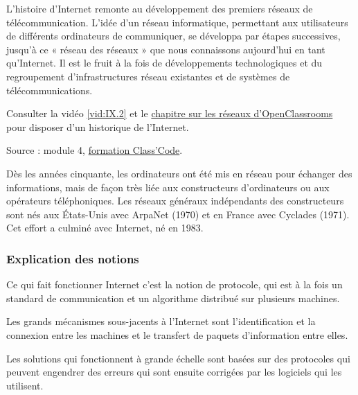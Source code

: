 L’histoire d'Internet remonte au développement des premiers réseaux de télécommunication. L’idée d’un réseau informatique, permettant aux utilisateurs de différents ordinateurs de communiquer, se développa par étapes successives, jusqu'à ce « réseau des réseaux » que nous connaissons aujourd’hui en tant qu'Internet. Il est le fruit à la fois de développements technologiques et du regroupement d’infrastructures réseau existantes et de systèmes de télécommunications.

Consulter la vidéo \cref{vid:IX.2} et le \href{https://openclassrooms.com/fr/courses/4297411-connecter-le-reseau/4304641-comprenez-l-evolution-des-reseaux#r-4358261}{chapitre sur les réseaux d'OpenClassrooms} pour disposer d'un historique de l'Internet. 


\noindent Source : module 4, \href{https://pixees.fr/classcode/formations/module4/}{formation Class'Code}.


\begin{tcolorbox}[title={Repères historiques}, toprule=0pt, leftrule=0pt, rightrule=0pt, arc=0pt,
                  fonttitle=\scshape\boxtitlefont,
                  colbacktitle=white, coltitle=firstcolor, colframe=firstcolor, colback=firstcolor!10,
                  breakable, enhanced jigsaw]
Dès les années cinquante, les ordinateurs ont été mis en réseau pour échanger des informations, mais de façon très liée aux constructeurs d’ordinateurs ou aux opérateurs téléphoniques. Les réseaux généraux indépendants des constructeurs sont nés aux États-Unis avec ArpaNet (1970) et en France avec Cyclades (1971). Cet effort a culminé avec Internet, né en 1983.
\end{tcolorbox}


\subsubsection[Explication des notions]{Explication des notions}
\label{subsub:IX.1.1.3}


\begin{jazzitemize}
\item Ce qui fait fonctionner Internet c'est la notion de protocole, qui est à la fois un standard de communication et un algorithme distribué sur plusieurs machines.
\item Les grands mécanismes sous-jacents à l'Internet sont l'identification et la connexion entre les machines et le transfert de paquets d'information entre elles.
\item Les solutions  qui fonctionnent à grande échelle sont basées sur des protocoles qui peuvent engendrer des erreurs qui sont ensuite corrigées par les logiciels qui les utilisent.
\end{jazzitemize}

